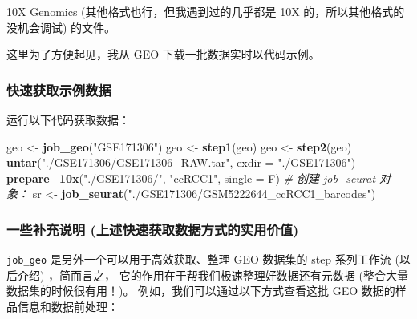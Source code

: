 \documentclass[
]{article}
\newenvironment{Shaded}{\begin{snugshade}}{\end{snugshade}}
\newcommand{\CommentTok}[1]{\textcolor[rgb]{0.56,0.35,0.01}{\textit{#1}}}
\newcommand{\DataTypeTok}[1]{\textcolor[rgb]{0.13,0.29,0.53}{#1}}
\newcommand{\KeywordTok}[1]{\textcolor[rgb]{0.13,0.29,0.53}{\textbf{#1}}}
\newcommand{\NormalTok}[1]{#1}
\newcommand{\OperatorTok}[1]{\textcolor[rgb]{0.81,0.36,0.00}{\textbf{#1}}}
\newcommand{\StringTok}[1]{\textcolor[rgb]{0.31,0.60,0.02}{#1}}
\begin{document}
10X Genomics (其他格式也行，但我遇到过的几乎都是 10X 的，所以其他格式的没机会调试) 的文件。

这里为了方便起见，我从 GEO 下载一批数据实时以代码示例。

\hypertarget{obtain}{%
\subsubsection{快速获取示例数据}\label{obtain}}

运行以下代码获取数据：

\begin{Shaded}
\begin{Highlighting}[]
\NormalTok{geo \textless{}{-}}\StringTok{ }\KeywordTok{job\_geo}\NormalTok{(}\StringTok{"GSE171306"}\NormalTok{)}
\NormalTok{geo \textless{}{-}}\StringTok{ }\KeywordTok{step1}\NormalTok{(geo)}
\NormalTok{geo \textless{}{-}}\StringTok{ }\KeywordTok{step2}\NormalTok{(geo)}
\KeywordTok{untar}\NormalTok{(}\StringTok{"./GSE171306/GSE171306\_RAW.tar"}\NormalTok{, }\DataTypeTok{exdir =} \StringTok{"./GSE171306"}\NormalTok{)}
\KeywordTok{prepare\_10x}\NormalTok{(}\StringTok{"./GSE171306/"}\NormalTok{, }\StringTok{"ccRCC1"}\NormalTok{, }\DataTypeTok{single =}\NormalTok{ F)}
\CommentTok{\# 创建 job\_seurat 对象：}
\NormalTok{sr \textless{}{-}}\StringTok{ }\KeywordTok{job\_seurat}\NormalTok{(}\StringTok{"./GSE171306/GSM5222644\_ccRCC1\_barcodes"}\NormalTok{)}
\end{Highlighting}
\end{Shaded}

\hypertarget{ux4e00ux4e9bux8865ux5145ux8bf4ux660e-ux4e0aux8ff0ux5febux901fux83b7ux53d6ux6570ux636eux65b9ux5f0fux7684ux5b9eux7528ux4ef7ux503c}{%
\subsubsection{一些补充说明 (上述快速获取数据方式的实用价值)}\label{ux4e00ux4e9bux8865ux5145ux8bf4ux660e-ux4e0aux8ff0ux5febux901fux83b7ux53d6ux6570ux636eux65b9ux5f0fux7684ux5b9eux7528ux4ef7ux503c}}

\texttt{job\_geo} 是另外一个可以用于高效获取、整理 GEO 数据集的 step 系列工作流 (以后介绍) ，简而言之，
它的作用在于帮我们极速整理好数据还有元数据 (整合大量数据集的时候很有用！)。
例如，我们可以通过以下方式查看这批 GEO 数据的样品信息和数据前处理：

\begin{Shaded}
\end{Shaded}
\end{document}
